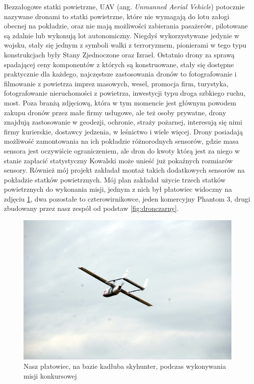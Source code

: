 Bezzałogowe statki powietrzne, UAV (ang. \textit{Unmanned Aerial Vehicle}) potocznie nazywane dronami to statki powietrzne, które nie wymagają do lotu załogi obecnej na pokładzie, oraz nie mają możliwości zabierania pasażerów, pilotowane są zdalnie lub wykonują lot autonomiczny. Niegdyś wykorzystywane jedynie w wojsku, stały się jednym z symboli walki z terroryzmem, pionierami w tego typu konstrukcjach były Stany Zjednoczone oraz Izrael. Ostatnio drony za sprawą spadającej ceny komponentów z których są konstruowane, stały się dostępne praktycznie dla każdego, najczęstsze zastosowania dronów to fotografowanie i filmowanie z powietrza imprez masowych, wesel, promocja firm, turystyka, fotografowanie nieruchomości z powietrza, inwestycji typu droga szbkiego ruchu, most. Poza branżą zdjęciową, która w tym momencie jest głównym powodem zakupu dronów przez małe firmy usługowe, ale też osoby prywatne, drony znajdują zastosowanie w geodezji, ochronie, straży pożarnej, interesują się nimi firmy kurierskie, dostawcy jedzenia, w leśnictwo i wiele więcej. Drony posiadają możliwość zamontowania na ich pokładzie różnorodnych sensorów, gdzie masa sensora jest oczywiście ograniczeniem, ale dron do kwoty którą jest za niego w stanie zapłacić statystyczny Kowalski może unieść już pokaźnych rozmiarów sensory. Również mój projekt zakładał montaż takich dodatkowych sensorów na pokładzie statków powietrznych. Mój plan zakładał użycie trzech statków powietrznych do wykonania misji, jednym z nich był płatowiec widoczny na zdjęciu \ref{fig:skyhunter}, dwa pozostałe to czterowirnikowce, jeden komercyjny Phantom 3, drugi zbudowany przez nasz zespół od podstaw \ref{fig:dronczarny}.

\begin{figure}[!th]
    \centering
    \includegraphics[width=15cm]{zalaczniki/obrazy/skyhunter.jpg}
    \caption{Nasz płatowiec, na bazie kadłuba skyhunter, podczas wykonywania misji konkursowej}
    \label{fig:skyhunter}
\end{figure}

